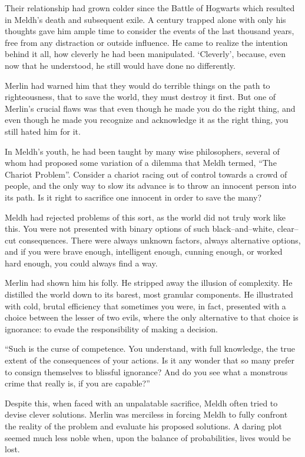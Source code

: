 Their relationship had grown colder since the Battle of Hogwarts which resulted in Meldh’s death and subsequent exile. A century trapped alone with only his thoughts gave him ample time to consider the events of the last thousand years, free from any distraction or outside influence. He came to realize the intention behind it all, how cleverly he had been manipulated. ‘Cleverly’, because, even now that he understood, he still would have done no differently.

Merlin had warned him that they would do terrible things on the path to righteousness, that to save the world, they must destroy it first. But one of Merlin’s crucial flaws was that even though he made you do the right thing, and even though he made you recognize and acknowledge it as the right thing, you still hated him for it.

In Meldh’s youth, he had been taught by many wise philosophers, several of whom had proposed some variation of a dilemma that Meldh termed, “The Chariot Problem”. Consider a chariot racing out of control towards a crowd of people, and the only way to slow its advance is to throw an innocent person into its path. Is it right to sacrifice one innocent in order to save the many?

Meldh had rejected problems of this sort, as the world did not truly work like this. You were not presented with binary options of such black\mbox{--}and\mbox{--}white, clear\mbox{--}cut consequences. There were always unknown factors, always alternative options, and if you were brave enough, intelligent enough, cunning enough, or worked hard enough, you could always find a way.

Merlin had shown him his folly. He stripped away the illusion of complexity. He distilled the world down to its barest, most granular components. He illustrated with cold, brutal efficiency that sometimes you were, in fact, presented with a choice between the lesser of two evils, where the only alternative to that choice is ignorance: to evade the responsibility of making a decision.

“Such is the curse of competence. You understand, with full knowledge, the true extent of the consequences of your actions. Is it any wonder that so many prefer to consign themselves to blissful ignorance? And do you see what a monstrous crime that really is, if you are capable?”

Despite this, when faced with an unpalatable sacrifice, Meldh often tried to devise clever solutions. Merlin was merciless in forcing Meldh to fully confront the reality of the problem and evaluate his proposed solutions. A daring plot seemed much less noble when, upon the balance of probabilities, lives would be lost.

